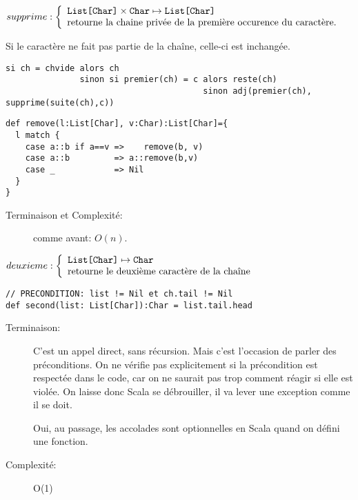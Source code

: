 \documentclass[10pt]{article}\usepackage[correction,nu]{esial}
\begin{document}
\begin{Question}
  $supprime: \left\{
    \begin{array}{l}
      \text{\texttt{List[Char]}}\times \text{\texttt{Char}}\mapsto \text{\texttt{List[Char]}}\\
      \text{retourne la chaine privée de la première occurence du caractère.}
    \end{array}\right.$  

  Si le caractère ne fait pas partie de la chaîne, celle-ci est inchangée.
\end{Question}
\begin{Reponse}
  \begin{Verbatim}[label=supprime(ch\quotesinglbase c)]
si ch = chvide alors ch
               sinon si premier(ch) = c alors reste(ch)
                                        sinon adj(premier(ch), supprime(suite(ch),c))
  \end{Verbatim}
  \begin{Verbatim}
def remove(l:List[Char], v:Char):List[Char]={
  l match {
    case a::b if a==v =>    remove(b, v)
    case a::b         => a::remove(b,v)
    case _            => Nil
  }
}    
  \end{Verbatim}
  \begin{description}
  \item[Terminaison et Complexité:] comme avant: $O(n)$. 
  \end{description}
\end{Reponse}

\begin{Question}
  $deuxieme: \left\{
    \begin{array}{l}
      \text{\texttt{List[Char]}}\mapsto \text{\texttt{Char}}\\
      \text{retourne le deuxième caractère de la chaîne}
    \end{array}\right.$  
\end{Question}
\begin{Reponse}
  \begin{Verbatim}[]
// PRECONDITION: list != Nil et ch.tail != Nil
def second(list: List[Char]):Char = list.tail.head
  \end{Verbatim}
  \begin{description}
  \item[Terminaison:] C'est un appel direct, sans récursion. Mais c'est
    l'occasion de parler des préconditions.  On ne vérifie pas explicitement si
    la précondition est respectée dans le code, car on ne saurait pas trop
    comment réagir si elle est violée. On laisse donc Scala se débrouiller, il
    va lever une exception comme il se doit.

    Oui, au passage, les accolades sont optionnelles en Scala quand on défini
    une fonction.
  \item[Complexité:] O(1)
  \end{description}
\end{Reponse}
\end{document}
